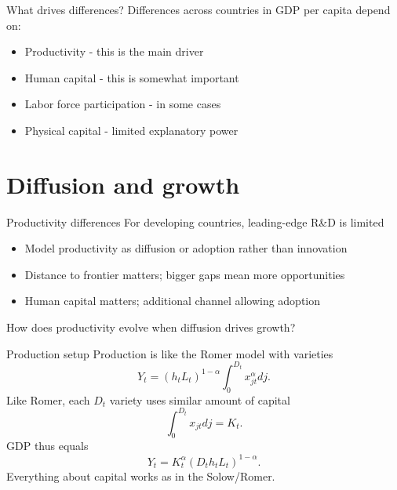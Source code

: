 \begin{frame}{What drives differences?}
Differences across countries in GDP per capita depend on:
\begin{itemize}
	\item Productivity - this is the main driver
	\item Human capital - this is somewhat important
	\item Labor force participation - in some cases
	\item Physical capital - limited explanatory power
\end{itemize}
\end{frame}

\section{Diffusion and growth}
\begin{frame}{Productivity differences}
For developing countries, leading-edge R\&D is limited
\begin{itemize}
	\item Model productivity as diffusion or adoption rather than innovation
	\item Distance to frontier matters; bigger gaps mean more opportunities
	\item Human capital matters; additional channel allowing adoption
\end{itemize}
How does productivity evolve when diffusion drives growth?
\end{frame}

\begin{frame}{Production setup}
Production is like the Romer model with varieties
\begin{equation}
	Y_t = (h_t L_t)^{1-\alpha} \int_{0}^{D_t} x_{jt}^{\alpha} dj. \label{EQ_final_dev}
\end{equation}
Like Romer, each $D_t$ variety uses similar amount of capital
\begin{equation}
	\int_{0}^{D_t} x_{jt} dj = K_t. \nonumber
\end{equation}
GDP thus equals
\begin{equation}
	Y_t = K_t^{\alpha}(D_th_tL_t)^{1-\alpha}. \label{EQ_Y_Dhl}
\end{equation}
Everything about capital works as in the Solow/Romer.
\end{frame}

